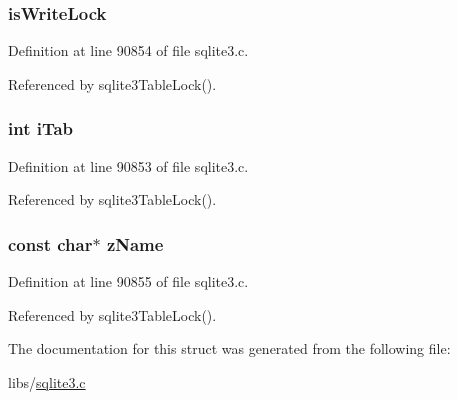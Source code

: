 \subsubsection[{is\+Write\+Lock}]{ is\+Write\+Lock}\label{struct_table_lock_aa2a01dd5afb009f09248dc65d2ea4587}


Definition at line 90854 of file sqlite3.\+c.



Referenced by sqlite3\+Table\+Lock().

\hypertarget{struct_table_lock_a760c7fcee56dbbf2730283e37700c480}{}
\subsubsection[{i\+Tab}]{\setlength{\rightskip}{0pt plus 5cm}int i\+Tab}\label{struct_table_lock_a760c7fcee56dbbf2730283e37700c480}


Definition at line 90853 of file sqlite3.\+c.



Referenced by sqlite3\+Table\+Lock().

\hypertarget{struct_table_lock_ab014fc02d99cc45050cdfcda485c780a}{}
\subsubsection[{z\+Name}]{\setlength{\rightskip}{0pt plus 5cm}const char$\ast$ z\+Name}\label{struct_table_lock_ab014fc02d99cc45050cdfcda485c780a}


Definition at line 90855 of file sqlite3.\+c.



Referenced by sqlite3\+Table\+Lock().



The documentation for this struct was generated from the following file\+:\begin{DoxyCompactItemize}
\item 
libs/\hyperlink{sqlite3_8c}{sqlite3.\+c}\end{DoxyCompactItemize}
